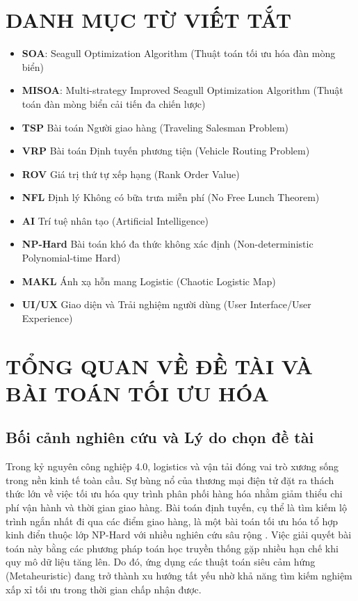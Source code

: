 \documentclass[12pt, a4paper]{article}
\begin{document}
\section*{DANH MỤC TỪ VIẾT TẮT}
\begin{itemize}
    \item \textbf{SOA}: Seagull Optimization Algorithm (Thuật toán tối ưu hóa đàn mòng biển)
    \item \textbf{MISOA}: Multi-strategy Improved Seagull Optimization Algorithm (Thuật toán đàn mòng biển cải tiến đa chiến lược)
    \item \textbf{TSP} \> Bài toán Người giao hàng (Traveling Salesman Problem)
    \item \textbf{VRP} \> Bài toán Định tuyến phương tiện (Vehicle Routing Problem)
    \item \textbf{ROV} \> Giá trị thứ tự xếp hạng (Rank Order Value)
    \item \textbf{NFL} \> Định lý Không có bữa trưa miễn phí (No Free Lunch Theorem)
    \item \textbf{AI} \> Trí tuệ nhân tạo (Artificial Intelligence)
    \item \textbf{NP-Hard} \> Bài toán khó đa thức không xác định (Non-deterministic Polynomial-time Hard)
    \item \textbf{MAKL} \> Ánh xạ hỗn mang Logistic (Chaotic Logistic Map)
    \item \textbf{UI/UX} \> Giao diện và Trải nghiệm người dùng (User Interface/User Experience)
\end{itemize}

\newpage
{}

\newpage
\section{TỔNG QUAN VỀ ĐỀ TÀI VÀ BÀI TOÁN TỐI ƯU HÓA}

\subsection{Bối cảnh nghiên cứu và Lý do chọn đề tài}
Trong kỷ nguyên công nghiệp 4.0, logistics và vận tải đóng vai trò xương sống trong nền kinh tế toàn cầu. Sự bùng nổ của thương mại điện tử đặt ra thách thức lớn về việc tối ưu hóa quy trình phân phối hàng hóa nhằm giảm thiểu chi phí vận hành và thời gian giao hàng. Bài toán định tuyến, cụ thể là tìm kiếm lộ trình ngắn nhất đi qua các điểm giao hàng, là một bài toán tối ưu hóa tổ hợp kinh điển thuộc lớp NP-Hard với nhiều nghiên cứu sâu rộng \cite{tsp_survey}. Việc giải quyết bài toán này bằng các phương pháp toán học truyền thống gặp nhiều hạn chế khi quy mô dữ liệu tăng lên. Do đó, ứng dụng các thuật toán siêu cảm hứng (Metaheuristic) đang trở thành xu hướng tất yếu nhờ khả năng tìm kiếm nghiệm xấp xỉ tối ưu trong thời gian chấp nhận được.
\end{document}
